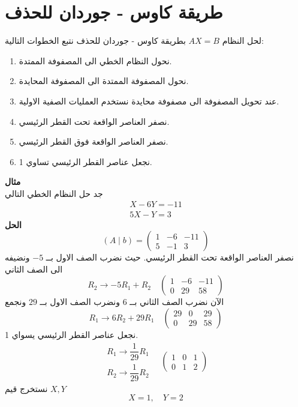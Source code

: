 \section[طريقة كاوس - جوردان للحذف]{طريقة كاوس - جوردان للحذف}

لحل النظام $AX=B$ بطريقة كاوس - جوردان للحذف نتبع الخطوات التالية:
\begin{enumerate}[leftmargin=*]
	\item نحول النظام الخطي الى المصفوفة الممتدة.
	\item نحول المصفوفة الممتدة الى المصفوفة المحايدة.
	\item عند تحويل المصفوفة الى مصفوفة محايدة نستخدم العمليات الصفية الاولية.
	\item نصفر العناصر الواقعة تحت القطر الرئيسي.
	\item نصفر العناصر الواقعة فوق القطر الرئيسي.
	\item نجعل عناصر القطر الرئيسي تساوي 1.
\end{enumerate}

\noindent
\textbf{مثال}\\ \noindent
جد حل النظام الخطي التالي
\begin{align*}
	X-6Y = -11\\
	5X - Y = 3
\end{align*}
\textbf{الحل}
\[
(A\mid b) =
\left(
\begin{array}{cc|c}
	1&-6&-11\\
	5&-1&3
\end{array}
\right)
\]
نصفر العناصر الواقعة تحت القطر الرئيسي. حيث نضرب الصف الاول بــ $-5$ ونضيفه الى الصف الثاني
\[
R_2\to-5R_1 + R_2  \quad 
\left(
\begin{array}{cc|c}
	1&-6&-11\\
	0&29&58
\end{array}
\right)
\]
الآن نضرب الصف الثاني بــ $6$ ونضرب الصف الاول بــ $29$ ونجمع
\[
R_1 \to 6R_2 + 29R_1 \quad
\left(
\begin{array}{cc|c}
	29&0&29\\
	0&29&58
\end{array}
\right) 
\]
نجعل عناصر القطر الرئيسي يسواي 1.
\[
\begin{array}{c}
	R_1 \to \dfrac{1}{29}R_1\\[10pt]
	R_2 \to \dfrac{1}{29}R_2
\end{array}\quad
\left(
\begin{array}{cc|c}
	1&0&1\\
	0&1&2
\end{array}
\right) 
\]
نستخرج قيم $X, Y$ 
\[
X=1, \quad Y=2 
\]
\newpage
